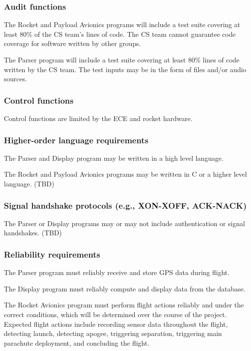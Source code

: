 \documentclass[onecolumn, draftclsnofoot, 10pt, compsoc]{IEEEtran}
\begin{document}
\subsubsection{Audit functions}
The Rocket and Payload Avionics programs will include a test suite covering at least 80\% of the CS team’s lines of code.  The CS team cannot guarantee code coverage for software written by other groups.

The Parser program will include a test suite covering at least 80\% lines of code written by the CS team.  The test inputs may be in the form of files and/or audio sources.

\subsubsection{Control functions}
Control functions are limited by the ECE and rocket hardware.

\subsubsection{Higher-order language requirements}
The Parser and Display program may be written in a high level language.

The Rocket and Payload Avionics programs may be written in C or a higher level language. (TBD)

\subsubsection{Signal handshake protocols (e.g., XON-XOFF, ACK-NACK)}
The Parser or Display programs may or may not include authentication or signal handshakes. (TBD)

\subsubsection{Reliability requirements}
The Parser program must reliably receive and store GPS data during flight.

The Display program must reliably compute and display data from the database.

The Rocket Avionics program must perform flight actions reliably and under the correct conditions, which will be determined over the course of the project.  Expected flight actions include recording sensor data throughout the flight, detecting launch, detecting apogee, triggering separation, triggering main parachute deployment, and concluding the flight.
\end{document}
